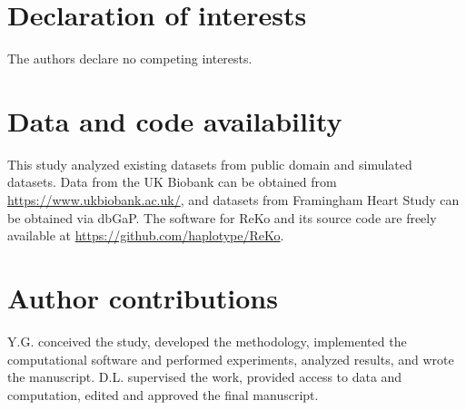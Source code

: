 \documentclass[12pt,Times]{article}
\begin{document}
\section{Declaration of interests}
The authors declare no competing interests. 


\section{Data and code availability}
This study analyzed existing datasets from public domain and simulated datasets.  Data from the UK Biobank can be obtained from \url{https://www.ukbiobank.ac.uk/}, and datasets from Framingham Heart Study can be obtained via dbGaP. 
The software for ReKo and its source code are freely available at \url{https://github.com/haplotype/ReKo}.

\section{Author contributions}
Y.G. conceived the study, developed the methodology, implemented the computational software and performed experiments, analyzed results, and wrote the manuscript. 
D.L. supervised the work, provided access to data and computation, edited and approved the final manuscript. 


\label{lastpage}
%


\end{document}
